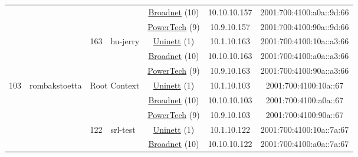 \begin{small}
\begin{center}
\begin{longtable}{|c|c|c|c|c|c|c|c|}
  &  &  &  & \multicolumn{2}{|c|}{\tiny{\href{https://www.broadnet.no}{Broadnet} (10)}} & \tiny{10.10.10.157} & \tiny{2001:700:4100:a0a::9d:66} \\* \cline{5-5}\cline{6-6}\cline{7-7}\cline{8-8}
  &  &  &  & \multicolumn{2}{|c|}{\tiny{\href{http://www.powertech.no}{PowerTech} (9)}} & \tiny{10.9.10.157} & \tiny{2001:700:4100:90a::9d:66} \\* \cline{3-3}\cline{4-4}\cline{5-5}\cline{6-6}\cline{7-7}\cline{8-8}
  &  & \multirow{3}{*}{\tiny{163}} & \multicolumn{1}{|l|}{\multirow{3}{*}{\tiny{hu-jerry}}} & \multicolumn{2}{|c|}{\tiny{\href{https://www.uninett.no}{Uninett} (1)}} & \tiny{10.1.10.163} & \tiny{2001:700:4100:10a::a3:66} \\* \cline{5-5}\cline{6-6}\cline{7-7}\cline{8-8}
  &  &  &  & \multicolumn{2}{|c|}{\tiny{\href{https://www.broadnet.no}{Broadnet} (10)}} & \tiny{10.10.10.163} & \tiny{2001:700:4100:a0a::a3:66} \\* \cline{5-5}\cline{6-6}\cline{7-7}\cline{8-8}
  &  &  &  & \multicolumn{2}{|c|}{\tiny{\href{http://www.powertech.no}{PowerTech} (9)}} & \tiny{10.9.10.163} & \tiny{2001:700:4100:90a::a3:66} \\ \hline
 \multirow{39}{*}{\tiny{103}} & \multicolumn{1}{|l|}{\multirow{39}{*}{\tiny{rombakstoetta}}} & \multicolumn{2}{|c|}{\multirow{3}{*}{\tiny{Root Context}}} & \multicolumn{2}{|c|}{\tiny{\href{https://www.uninett.no}{Uninett} (1)}} & \tiny{10.1.10.103} & \tiny{2001:700:4100:10a::67} \\* \cline{5-5}\cline{6-6}\cline{7-7}\cline{8-8}
  &  & \multicolumn{2}{|c|}{} & \multicolumn{2}{|c|}{\tiny{\href{https://www.broadnet.no}{Broadnet} (10)}} & \tiny{10.10.10.103} & \tiny{2001:700:4100:a0a::67} \\* \cline{5-5}\cline{6-6}\cline{7-7}\cline{8-8}
  &  & \multicolumn{2}{|c|}{} & \multicolumn{2}{|c|}{\tiny{\href{http://www.powertech.no}{PowerTech} (9)}} & \tiny{10.9.10.103} & \tiny{2001:700:4100:90a::67} \\* \cline{3-3}\cline{4-4}\cline{5-5}\cline{6-6}\cline{7-7}\cline{8-8}
  &  & \multirow{3}{*}{\tiny{122}} & \multicolumn{1}{|l|}{\multirow{3}{*}{\tiny{srl-test}}} & \multicolumn{2}{|c|}{\tiny{\href{https://www.uninett.no}{Uninett} (1)}} & \tiny{10.1.10.122} & \tiny{2001:700:4100:10a::7a:67} \\* \cline{5-5}\cline{6-6}\cline{7-7}\cline{8-8}
  &  &  &  & \multicolumn{2}{|c|}{\tiny{\href{https://www.broadnet.no}{Broadnet} (10)}} & \tiny{10.10.10.122} & \tiny{2001:700:4100:a0a::7a:67} \\* \cline{5-5}\cline{6-6}\cline{7-7}\cline{8-8}

\end{longtable}
\end{center}
\end{small}
